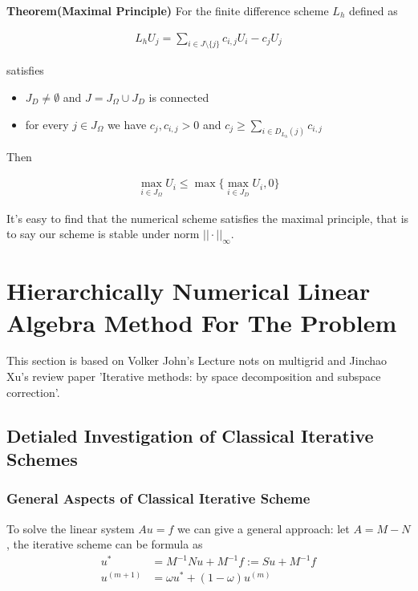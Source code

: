\documentclass[12pt]{amsart}
\begin{document}
\textbf{Theorem(Maximal Principle)} For the finite difference scheme $L_h$ defined as

\begin{align*}
L_hU_j = \sum_{i\in J\setminus  \{j\}}c_{i,j}U_i-c_jU_j
\end{align*} 

satisfies

\begin{itemize}
\item $J_D\not=\emptyset$ and $J=J_\Omega \cup J_D$ is connected
\item for every $j\in J_\Omega$ we have $c_j,c_{i,j}>0$ and $c_j\ge \sum_{i\in D_{L_h}(j)}c_{i,j}$
\end{itemize}

Then

\begin{align*}
\max_{i\in J_\Omega} U_i \le \max\{\max_{i\in J_D}U_i,0\}
\end{align*}

It's easy to find that the numerical scheme satisfies the maximal principle, that is to say our scheme is stable under norm $||\cdot||_\infty$.






\section{Hierarchically Numerical Linear Algebra Method For The Problem}

This section is based on Volker John's Lecture nots on multigrid and Jinchao Xu's review paper 'Iterative methods: by space decomposition and subspace correction'.

\subsection{Detialed Investigation of Classical Iterative Schemes}
\subsubsection{General Aspects of Classical Iterative Scheme}
To solve the linear system $Au=f$ we can give a general approach: let $A=M-N$ , the iterative scheme can be formula as
\begin{align*}
u^{*}&=M^{-1}Nu+M^{-1}f:=Su+M^{-1}f\\
u^{(m+1)}&=\omega u^*+(1-\omega)u^{(m)}
\end{align*}
\end{document}
